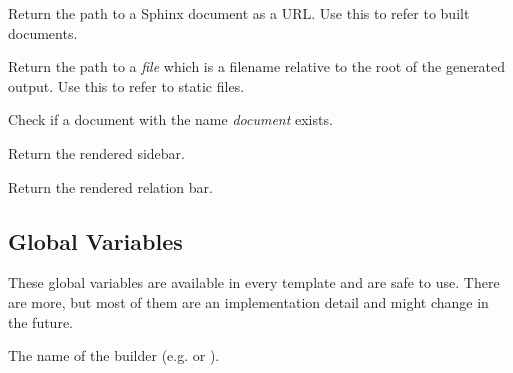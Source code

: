 \documentclass[letterpaper,10pt,english]{sphinxmanual}
\begin{document}
\begin{fulllineitems}
\label{templating:pathto}
Return the path to a Sphinx document as a URL.  Use this to refer to built
documents.

\end{fulllineitems}


\begin{fulllineitems}
Return the path to a \emph{file} which is a filename relative to the root of the
generated output.  Use this to refer to static files.

\end{fulllineitems}


\begin{fulllineitems}
\label{templating:hasdoc}
Check if a document with the name \emph{document} exists.

\end{fulllineitems}


\begin{fulllineitems}
\label{templating:sidebar}
Return the rendered sidebar.

\end{fulllineitems}


\begin{fulllineitems}
\label{templating:relbar}
Return the rendered relation bar.

\end{fulllineitems}



\subsection{Global Variables}
\label{templating:global-variables}
These global variables are available in every template and are safe to use.
There are more, but most of them are an implementation detail and might change
in the future.

\begin{fulllineitems}
\label{templating:builder}
The name of the builder (e.g.  or ).

\end{fulllineitems}
\end{document}
